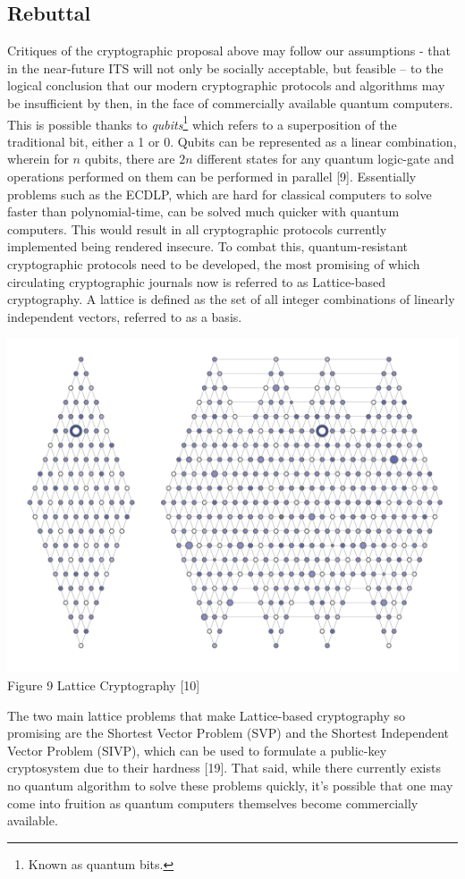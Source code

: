 \documentclass[conference,compsoc]{IEEEtran}
\begin{document}
\subsection{Rebuttal}
Critiques of the cryptographic proposal above may follow our assumptions - that in the near-future ITS will not only be socially acceptable, but feasible – to the logical conclusion that our modern cryptographic protocols and algorithms may be insufficient by then, in the face of commercially available quantum computers. This is possible thanks to \emph{qubits}\footnote{Known as quantum bits.} which refers to a superposition of the traditional bit, either a 1 or 0. Qubits can be represented as a linear combination, wherein for $n$ qubits, there are $2n$ different states for any quantum logic-gate and operations performed on them can be performed in parallel [9]. Essentially problems such as the ECDLP, which are hard for classical computers to solve faster than polynomial-time, can be solved much quicker with quantum computers. This would result in all cryptographic protocols currently implemented being rendered insecure. To combat this, quantum-resistant cryptographic protocols need to be developed, the most promising of which circulating cryptographic journals now is referred to as Lattice-based cryptography. A lattice is defined as the set of all integer combinations of linearly independent vectors, referred to as a basis.
\begin{center}
\includegraphics[scale = .6]{lattice.png}
\small{Figure 9 Lattice Cryptography [10]}
\break
\end{center}
The two main lattice problems that make Lattice-based cryptography so promising are the Shortest Vector Problem (SVP) and the Shortest Independent Vector Problem (SIVP), which can be used to formulate a public-key cryptosystem due to their hardness [19]. That said, while there currently exists no quantum algorithm to solve these problems quickly, it’s possible that one may come into fruition as quantum computers themselves become commercially available.
\end{document}
